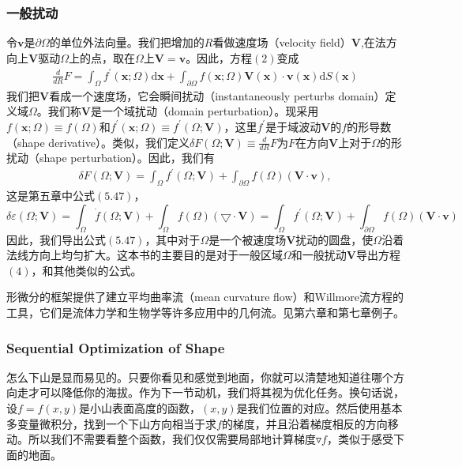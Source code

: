 \documentclass[12pt,a4paper]{article}
\numberwithin{equation}{section}
\begin{document}
\subsubsection{一般扰动}
令$\boldsymbol{v}$是$\partial \Omega$的单位外法向量。我们把增加的$R$看做速度场（velocity field）$\mathbf{V}$,在法方向上$\mathbf{V}$驱动$\Omega$上的点，取在$\Omega$上$\mathbf{V}=\boldsymbol{v}$。因此，方程$(2)$变成
\begin{gather}
\frac{d}{dR}F=\int_{\Omega}f^{'}(\mathbf{x};\Omega)\mathrm{d}\mathbf{x} + \int_{\partial \Omega}f(\mathbf{x};\Omega)\mathbf{V}(\mathbf{x})\cdot \boldsymbol{v}(\mathbf{x})\mathrm{d}S(\mathbf{x})
\end{gather}
我们把$\mathbf{V}$看成一个速度场，它会瞬间扰动（instantaneously perturbs domain）定义域$\Omega$。我们称$\mathbf{V}$是一个域扰动（domain perturbation）。现采用$f(\mathbf{x};\Omega)\equiv f(\Omega)$和$f^{'}(\mathbf{x};\Omega)\equiv f^{'}(\Omega;\mathbf{V})$，这里$f^{'}$是于域波动$\mathbf{V}$的$f$的形导数（shape derivative）。类似，我们定义$\delta F(\Omega;\mathbf{V})\equiv \frac{d}{dR}F$为$F$在方向$\mathbf{V}$上对于$\Omega$的形扰动（shape perturbation）。因此，我们有
\begin{gather}
\delta F(\Omega;\mathbf{V})=\int_{\Omega}f^{'}(\Omega;\mathbf{V})+\int_{\partial \Omega}f(\Omega)(\mathbf{V} \cdot \boldsymbol{v}),
\end{gather}
这是第五章中公式$(5.47)$，
$$\delta \varepsilon (\Omega;\mathbf{V})=\int_{\Omega}\dot{f}(\Omega;\mathbf{V})+\int_{\Omega}f(\Omega)(\bigtriangledown \cdot \mathbf{V})=\int_{\Omega}f^{'}(\Omega;\mathbf{V})+\int_{\partial \Omega}f(\Omega)(\mathbf{V} \cdot \boldsymbol{v})$$因此，我们导出公式$(5.47)$，其中对于$\Omega$是一个被速度场$\mathbf{V}$扰动的圆盘，使$\Omega$沿着法线方向上均匀扩大。这本书的主要目的是对于一般区域$\Omega$和一般扰动$\mathbf{V}$导出方程$(4)$，和其他类似的公式。

形微分的框架提供了建立平均曲率流（mean curvature flow）和Willmore流方程的工具，它们是流体力学和生物学等许多应用中的几何流。见第六章和第七章例子。

\subsubsection{Sequential Optimization of Shape}
怎么下山是显而易见的。只要你看见和感觉到地面，你就可以清楚地知道往哪个方向走才可以降低你的海拔。作为下一节动机，我们将其视为优化任务。换句话说，设$f=f(x,y)$是小山表面高度的函数，$(x,y)$是我们位置的对应。然后使用基本多变量微积分，找到一个下山方向相当于求$f$的梯度，并且沿着梯度相反的方向移动。所以我们不需要看整个函数，我们仅仅需要局部地计算梯度$\triangledown f$，类似于感受下面的地面。
\end{document}
